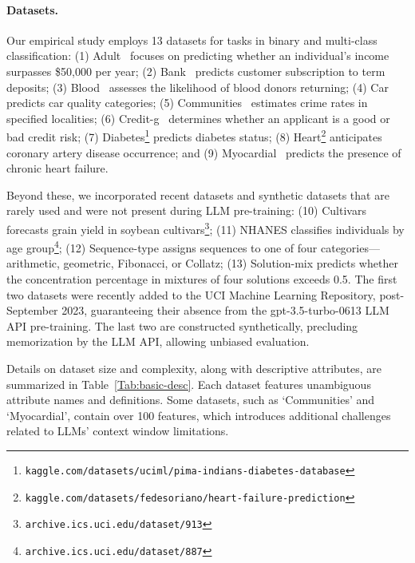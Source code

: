 \paragraph{Datasets.}
Our empirical study employs 13 datasets for tasks in binary and multi-class classification: (1) Adult~\cite{asuncion2007uci} focuses on predicting whether an individual’s income surpasses \$50,000 per year; (2) Bank~\cite{moro2014data} predicts customer subscription to term deposits; (3) Blood~\cite{yeh2009knowledge} assesses the likelihood of blood donors returning; (4) Car~\cite{kadra2021well} predicts car quality categories; (5) Communities~\cite{misc_communities_and_crime_183} estimates crime rates in specified localities; (6) Credit-g~\cite{kadra2021well} determines whether an applicant is a good or bad credit risk; (7) Diabetes\footnote{\texttt{kaggle.com/datasets/uciml/pima-indians-diabetes-database}} predicts diabetes status; (8) Heart\footnote{\texttt{kaggle.com/datasets/fedesoriano/heart-failure-prediction}} anticipates coronary artery disease occurrence; and (9) Myocardial~\cite{misc_myocardial_infarction_complications_579} predicts the presence of chronic heart failure.

Beyond these, we incorporated recent datasets and synthetic datasets that are rarely used and were not present during LLM pre-training: (10) Cultivars forecasts grain yield in soybean cultivars\footnote{\texttt{archive.ics.uci.edu/dataset/913}}; (11) NHANES classifies individuals by age group\footnote{\texttt{archive.ics.uci.edu/dataset/887}}; (12) Sequence-type assigns sequences to one of four categories—arithmetic, geometric, Fibonacci, or Collatz; (13) Solution-mix predicts whether the concentration percentage in mixtures of four solutions exceeds 0.5. The first two datasets were recently added to the UCI Machine Learning Repository, post-September 2023, guaranteeing their absence from the gpt-3.5-turbo-0613 LLM API pre-training. The last two are constructed synthetically, precluding memorization by the LLM API, allowing unbiased evaluation.

Details on dataset size and complexity, along with descriptive attributes, are summarized in Table~\ref{Tab:basic-desc}.
Each dataset features unambiguous attribute names and definitions. Some datasets, such as `Communities' and `Myocardial', contain over 100 features, which introduces additional challenges related to LLMs’ context window limitations.

\vspace*{-0.12in}

